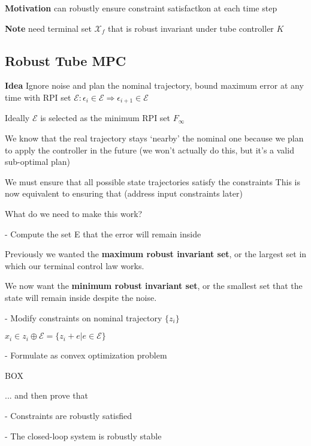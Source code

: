 \textbf{Motivation} can robustly ensure constraint satisfactkon at each time step

\textbf{Note} need terminal set $\mathcal{X}_f$ that is robust invariant under tube controller $K$


\subsection{Robust Tube MPC}

\textbf{Idea}
Ignore noise and plan the nominal trajectory,
bound maximum error at any time with RPI set
$\mathcal{E}: \epsilon_i \in \mathcal{E}  ⇒ \epsilon_{i+1} \in \mathcal{E}$

Ideally $\mathcal{E}$ is selected as the minimum RPI set $F_\infty$

We know that the real trajectory stays ‘nearby’ the nominal one%
because we plan to apply the controller%
in the future
(we won’t actually do this, but it’s a valid sub-optimal plan)

We must ensure that all possible state trajectories satisfy the constraints
This is now equivalent to ensuring that %
(address input constraints later)


What do we need to make this work?

- Compute the set E that the error will remain inside

Previously we wanted the \textbf{maximum robust invariant set}, or the largest set in
which our terminal control law works.

We now want the \textbf{minimum robust invariant set}, or the smallest set that the
state will remain inside despite the noise.

- Modify constraints on nominal trajectory $\{z_i\}$

$x_i \in z_i \oplus \mathcal{E} =
	\{z_i + e | e \in \mathcal{E}\}$

- Formulate as convex optimization problem

BOX

... and then prove that

- Constraints are robustly satisfied

- The closed-loop system is robustly stable



